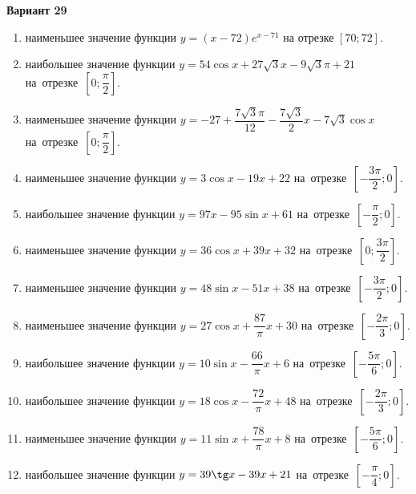 \documentclass[a4paper,10pt]{article}
\begin{document}
\begin{center}\Large\textbf{Вариант 29}\end{center}

\begin{enumerate}
\item {} наименьшее значение функции $y = \left(x-72\right)e^{x-71}$ на отрезке $\left[70;72\right]$.

\item {} наибольшее значение функции $y = 54\cos x+27\sqrt{3}x-9\sqrt{3}\pi +21$ на~отрезке~$\left[0;\dfrac{\pi }{2}\right]$.

\item {} наименьшее значение функции $y = -27+\dfrac{7\sqrt{3} \pi}{12}-\dfrac{7\sqrt{3}}{2}x-7\sqrt{3}\cos x$ на~отрезке~$\left[0;\dfrac{\pi }{2}\right]$.

\item {} наименьшее значение функции $y = 3\cos x-19x+22$ на~отрезке~$\left[-\dfrac{3\pi }{2};0\right]$.

\item {} наибольшее значение функции $y = 97x-95\sin x+61$ на~отрезке~$\left[-\dfrac{\pi }{2};0\right]$.

\item {} наименьшее значение функции $y = 36\cos x+39x+32$ на~отрезке~$\left[0;\dfrac{3\pi }{2}\right]$.

\item {} наименьшее значение функции $y = 48\sin x-51x+38$ на~отрезке~$\left[-\dfrac{3\pi }{2};0\right]$.

\item {} наименьшее значение функции $y = 27\cos x+\dfrac{87}{\pi }x +30$ на~отрезке~$\left[-\dfrac{2\pi }{3};0\right]$.

\item {} наибольшее значение функции $y = 10\sin x-\dfrac{66}{\pi }x+6$ на~отрезке~$\left[-\dfrac{5\pi }{6};0\right]$.

\item {} наибольшее значение функции $y = 18\cos x-\dfrac{72}{\pi }x+48$ на~отрезке~$\left[-\dfrac{2\pi }{3};0\right]$.

\item {} наименьшее значение функции $y = 11\sin x+\dfrac{78}{\pi }x+8$ на~отрезке~$\left[-\dfrac{5\pi }{6};0\right]$.

\item {} наибольшее значение функции $y = 39\tg x-39x+21$ на~отрезке~$\left[-\dfrac{\pi }{4};0\right]$.


\end{enumerate}
\end{document}
